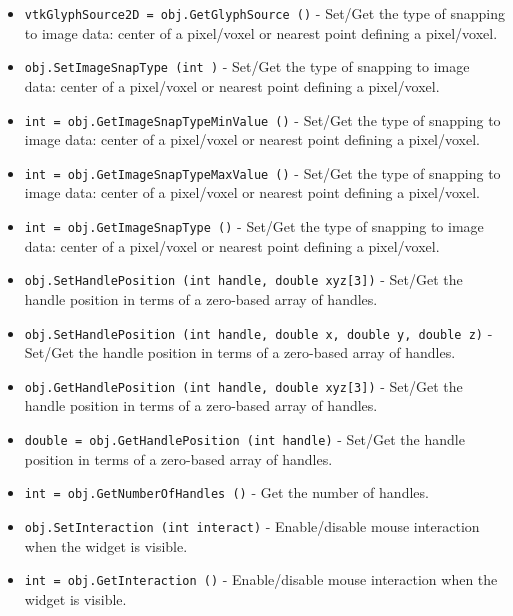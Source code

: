 \begin{itemize}
\item  \verb|vtkGlyphSource2D = obj.GetGlyphSource ()| -  Set/Get the type of snapping to image data: center of a pixel/voxel or
 nearest point defining a pixel/voxel.

\item  \verb|obj.SetImageSnapType (int )| -  Set/Get the type of snapping to image data: center of a pixel/voxel or
 nearest point defining a pixel/voxel.

\item  \verb|int = obj.GetImageSnapTypeMinValue ()| -  Set/Get the type of snapping to image data: center of a pixel/voxel or
 nearest point defining a pixel/voxel.

\item  \verb|int = obj.GetImageSnapTypeMaxValue ()| -  Set/Get the type of snapping to image data: center of a pixel/voxel or
 nearest point defining a pixel/voxel.

\item  \verb|int = obj.GetImageSnapType ()| -  Set/Get the type of snapping to image data: center of a pixel/voxel or
 nearest point defining a pixel/voxel.

\item  \verb|obj.SetHandlePosition (int handle, double xyz[3])| -  Set/Get the handle position in terms of a zero-based array of handles.

\item  \verb|obj.SetHandlePosition (int handle, double x, double y, double z)| -  Set/Get the handle position in terms of a zero-based array of handles.

\item  \verb|obj.GetHandlePosition (int handle, double xyz[3])| -  Set/Get the handle position in terms of a zero-based array of handles.

\item  \verb|double = obj.GetHandlePosition (int handle)| -  Set/Get the handle position in terms of a zero-based array of handles.

\item  \verb|int = obj.GetNumberOfHandles ()| -  Get the number of handles.

\item  \verb|obj.SetInteraction (int interact)| -  Enable/disable mouse interaction when the widget is visible.

\item  \verb|int = obj.GetInteraction ()| -  Enable/disable mouse interaction when the widget is visible.


\end{itemize}

